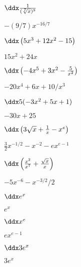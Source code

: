 \begin{exercises}
\begin{exercise} $\ddx \frac{1}{(\sqrt[7]{x})^9}$
\begin{answer} $-(9/7)x^{-16/7}$
\end{answer}\end{exercise}


\begin{exercise} $\ddx \left(5x^3+12x^2-15\right)$
\begin{answer} $15x^2+24x$
\end{answer}\end{exercise}

\begin{exercise} $\ddx \left(-4x^5 + 3x^2 - \frac{5}{x^2}\right)$
\begin{answer} $-20x^4+6x+10/x^3$
\end{answer}\end{exercise}

\begin{exercise} $\ddx 5(-3x^2 + 5x + 1)$
\begin{answer} $-30x+25$
\end{answer}\end{exercise}

\begin{exercise} $\ddx \left(3\sqrt{x} + \frac{1}{x} - x^e\right)$
\begin{answer} $\frac{3}{2}x^{-1/2}-x^{-2}-ex^{e-1}$
\end{answer}\end{exercise}


\begin{exercise} $\ddx \left(\frac{x^2}{x^7}+\frac{\sqrt{x}}{x}\right)$
\begin{answer} $-5x^{-6} - x^{-3/2}/2$
\end{answer}\end{exercise}

\begin{exercise} $\ddx e^x$
\begin{answer} $e^x$
\end{answer}\end{exercise}

\begin{exercise} $\ddx x^e$
\begin{answer} $ex^{e-1}$
\end{answer}\end{exercise}

\begin{exercise} $\ddx 3e^x$
\begin{answer} $3e^x$
\end{answer}\end{exercise}


\end{exercises}
